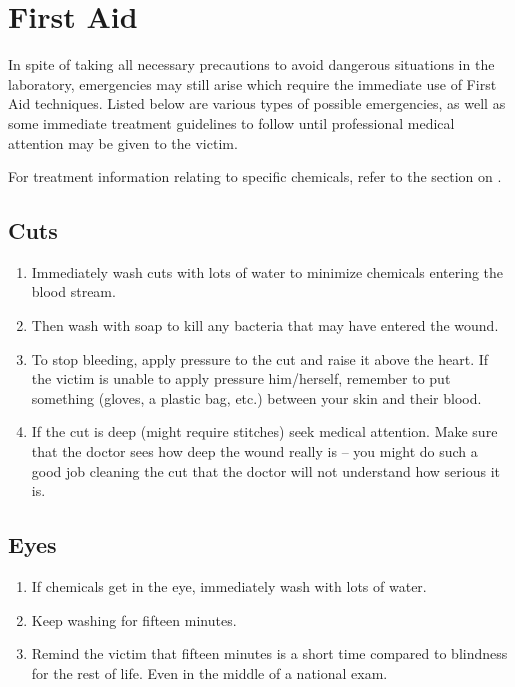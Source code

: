 \chapter{First Aid}
\label{cha:firstaid}

In spite of taking all necessary precautions to avoid dangerous situations in the laboratory, emergencies may still arise which require the immediate use of First Aid techniques. Listed below are various types of possible emergencies, as well as some immediate treatment guidelines to follow until professional medical attention may be given to the victim.

For treatment information relating to specific chemicals, refer to the section on .


\section{Cuts}

\begin{enumerate}
\item{Immediately wash cuts with lots of water 
to minimize chemicals entering the blood stream.}
\item{Then wash with soap to kill any bacteria that may have entered the wound.}
\item{To stop bleeding, apply pressure to the cut and raise it above the heart. 
If the victim is unable to apply pressure him/herself, 
remember to put something (gloves, a plastic bag, etc.) 
between your skin and their blood.}
\item{If the cut is deep (might require stitches) seek medical attention. 
Make sure that the doctor sees how deep the wound really is -- 
you might do such a good job cleaning the cut 
that the doctor will not understand how serious it is.}
\end{enumerate}

\section{Eyes}

\begin{enumerate}
\item{If chemicals get in the eye, immediately wash with lots of water.}
\item{Keep washing for fifteen minutes.}
\item{Remind the victim that fifteen minutes is a short time 
compared to blindness for the rest of life. 
Even in the middle of a national exam.}
\end{enumerate}

